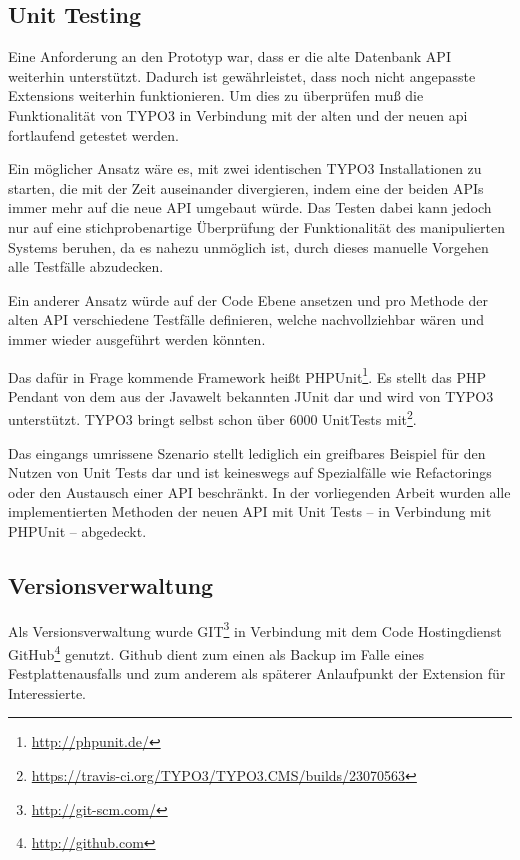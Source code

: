 \subsection{Unit Testing}
Eine Anforderung an den Prototyp war, dass er die alte Datenbank API weiterhin unterstützt. Dadurch ist gewährleistet, dass noch nicht angepasste Extensions weiterhin funktionieren. Um dies zu überprüfen muß die Funktionalität von TYPO3 in Verbindung mit der alten und der neuen \gls{api} fortlaufend getestet werden.

Ein möglicher Ansatz wäre es, mit zwei identischen TYPO3 Installationen zu starten, die mit der Zeit auseinander divergieren, indem eine der beiden APIs immer mehr auf die neue API umgebaut würde. Das Testen dabei kann jedoch nur auf eine stichprobenartige Überprüfung der Funktionalität des manipulierten Systems beruhen, da es nahezu unmöglich ist, durch dieses manuelle Vorgehen alle Testfälle abzudecken.

Ein anderer Ansatz würde auf der Code Ebene ansetzen und pro Methode der alten API verschiedene Testfälle definieren, welche nachvollziehbar wären und immer wieder ausgeführt werden könnten.

Das dafür in Frage kommende Framework heißt PHPUnit\footnote{\url{http://phpunit.de/}}. Es stellt das PHP Pendant von dem aus der Javawelt bekannten JUnit dar und wird von TYPO3 unterstützt. TYPO3 bringt selbst schon über 6000 UnitTests mit\footnote{\url{https://travis-ci.org/TYPO3/TYPO3.CMS/builds/23070563}}.

Das eingangs umrissene Szenario stellt lediglich ein greifbares Beispiel für den Nutzen von Unit Tests dar und ist keineswegs auf Spezialfälle wie Refactorings oder den Austausch einer API beschränkt. In der vorliegenden Arbeit wurden alle implementierten Methoden der neuen API mit Unit Tests – in Verbindung mit PHPUnit – abgedeckt.

\subsection{Versionsverwaltung}
Als Versionsverwaltung wurde GIT\footnote{\url{http://git-scm.com/}} in Verbindung mit dem Code Hostingdienst GitHub\footnote{\url{http://github.com}} genutzt. Github dient zum einen als Backup im Falle eines Festplattenausfalls und zum anderem als späterer Anlaufpunkt der Extension für Interessierte.


